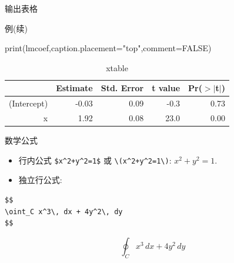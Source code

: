 \documentclass[
  12pt,
  ignorenonframetext,
  aspectratio=169, 12pt,table,t,utf-8]{beamer}
\newenvironment{Shaded}{\begin{snugshade}}{\end{snugshade}}
\newcommand{\AttributeTok}[1]{\textcolor[rgb]{0.77,0.63,0.00}{#1}}
\newcommand{\ConstantTok}[1]{\textcolor[rgb]{0.00,0.00,0.00}{#1}}
\newcommand{\FunctionTok}[1]{\textcolor[rgb]{0.00,0.00,0.00}{#1}}
\newcommand{\NormalTok}[1]{#1}
\newcommand{\StringTok}[1]{\textcolor[rgb]{0.31,0.60,0.02}{#1}}
\begin{document}
\begin{frame}[fragile]{输出表格}
\protect\hypertarget{ux8f93ux51faux8868ux683c}{}
\begin{block}{例(续)}
\protect\hypertarget{ux4f8bux7eed}{}
\small

\begin{Shaded}
\begin{Highlighting}[]
\FunctionTok{print}\NormalTok{(lmcoef,}\AttributeTok{caption.placement=}\StringTok{"top"}\NormalTok{,}\AttributeTok{comment=}\ConstantTok{FALSE}\NormalTok{)}
\end{Highlighting}
\end{Shaded}

\begin{table}[ht]
\centering
\caption{xtable} 
\begin{tabular}{rrrrr}
  \hline
 & Estimate & Std. Error & t value & Pr($>$$|$t$|$) \\ 
  \hline
(Intercept) & -0.03 & 0.09 & -0.3 & 0.73 \\ 
  x & 1.92 & 0.08 & 23.0 & 0.00 \\ 
   \hline
\end{tabular}
\end{table}
\end{block}
\end{frame}

\begin{frame}[fragile]{数学公式}
\protect\hypertarget{ux6570ux5b66ux516cux5f0f}{}
\begin{itemize}
\item
  行内公式 \texttt{\$x\^{}2+y\^{}2=1\$} 或
  \texttt{\textbackslash{}(x\^{}2+y\^{}2=1\textbackslash{})}:
  \(x^2+y^2=1\).
\item
  独立行公式:
\end{itemize}

\begin{verbatim}
$$
\oint_C x^3\, dx + 4y^2\, dy
$$
\end{verbatim}

\[
\oint_C x^3\, dx + 4y^2\, dy
\]
\end{frame}
\end{document}
